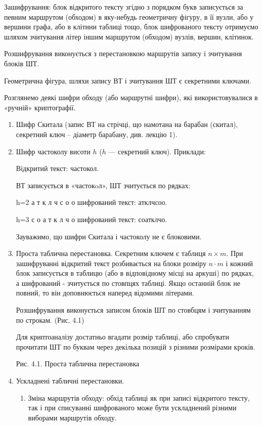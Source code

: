 Зашифрування: блок відкритого тексту згідно з порядком букв
записується за певним маршрутом (обходом) в яку-небудь геометричну
фігуру, в її вузли, або у вершини графа, або в клітини таблиці тощо, блок
шифрованого тексту отримуємо шляхом зчитування літер іншим маршрутом
(обходом) вузлів, вершин, клітинок.

Розшифрування виконується з перестановкою маршрутів запису і
зчитування блоків ШТ.

Геометрична фігура, шляхи запису ВТ і зчитування ШТ є секретними
ключами.

Розглянемо деякі шифри обходу (або маршрутні шифри), які
використовувалися в «ручній» криптографії.

\begin{enumerate}
    \item Шифр Скитала (запис ВТ на стрічці, що намотана на барабан (скитал),
    секретний ключ – діаметр барабану, див. лекцію 1).
    \item Шифр частоколу висоти $h$ ($h$ --- секретний ключ). Приклади:
    
    Відкритий текст: частокол.
    
    ВТ записується в «частокoл», ШТ зчитується по рядках:
    
    h=2
    а т к л
    ч с о о
    шифрований текст: атклчсоо.
    
    h=3
    с о
    а т к л
    ч о
    шифрований текст: соатклчо.
    
    Зауважимо, що шифри Скитала і частоколу не є блоковими.
    
    \item Проста таблична перестановка. Секретним ключем є таблиця $n \times m$.
    При зашифруванні відкритий текст розбивається на блоки розміру $n \cdot m$ і
    кожний блок записується в таблицю (або в відповідному місці на аркуші)
    по рядках, а шифрований - зчитується по стовпцях таблиці. Якщо останній
    блок не повний, то він доповнюється наперед відомими літерами.
    
    Розшифрування виконується записом блоків ШТ по стовбцям і
    зчитуванням по строкам. (Рис. 4.1)
    
    Для криптоаналізу достатньо вгадати розмір таблиці, або спробувати
    прочитати ШТ по буквам через декілька позицій з різними розмірами
    кроків.
    
    \beautifulImage
    
    Рис. 4.1. Проста таблична перестановка
    
    \item Ускладнені табличні перестановки.
        \begin{enumerate}
            \item Зміна маршрутів обходу: обхід таблиці як при записі відкритого
            тексту, так і при списуванні шифрованого може бути ускладнений різними
            виборами маршрутів обходу.
            

\end{enumerate}
\end{enumerate}
